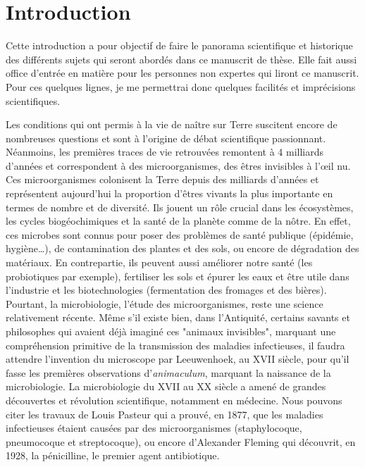 \chapter*{Introduction}

Cette introduction a pour objectif de faire le panorama scientifique et historique des différents sujets qui seront abordés dans ce manuscrit de thèse. Elle fait aussi office d'entrée en matière pour les personnes non expertes qui liront ce manuscrit. Pour ces quelques lignes, je me permettrai donc quelques facilités et imprécisions scientifiques.

Les conditions qui ont permis à la vie de naître sur Terre suscitent encore de nombreuses questions et sont à l'origine de débat scientifique passionnant. Néanmoins, les premières traces de vie retrouvées remontent à 4 milliards d'années et correspondent à des microorganismes, des êtres invisibles à l'{\oe}il nu. Ces microorganismes colonisent la Terre depuis des milliards d'années et représentent aujourd'hui la proportion d'êtres vivants la plus importante en termes de nombre et de diversité. Ils jouent un rôle crucial dans les écosystèmes, les cycles biogéochimiques et la santé de la planète comme de la nôtre. En effet, ces microbes sont connus pour poser des problèmes de santé publique (épidémie, hygiène\dots), de contamination des plantes et des sols, ou encore de dégradation des matériaux. En contrepartie, ils peuvent aussi améliorer notre santé (les probiotiques par exemple), fertiliser les sols et épurer les eaux et être utile dans l'industrie et les biotechnologies (fermentation des fromages et des bières). Pourtant, la microbiologie, l'étude des microorganismes, reste une science relativement récente. Même s'il existe bien, dans l'Antiquité, certains savants et philosophes qui avaient déjà imaginé ces "animaux invisibles", marquant une compréhension primitive de la transmission des maladies infectieuses, il faudra attendre l'invention du microscope par Leeuwenhoek, au XVII\ieme{} siècle, pour qu'il fasse les premières observations d'\textit{animaculum}, marquant la naissance de la microbiologie. La microbiologie du XVII\ieme{} au XX\ieme{} siècle a amené de grandes découvertes et révolution scientifique, notamment en médecine. Nous pouvons citer les travaux de Louis Pasteur qui a prouvé, en 1877, que les maladies infectieuses étaient causées par des microorganismes (staphylocoque, pneumocoque et streptocoque), ou encore d'Alexander Fleming qui découvrit, en 1928, la pénicilline, le premier agent antibiotique. 

